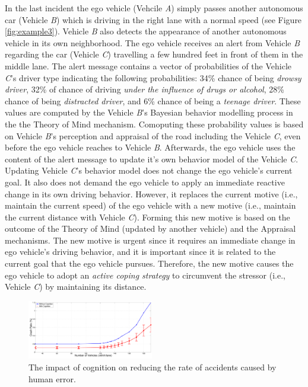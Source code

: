 \documentclass[journal, 11pt]{IEEEtran}
\begin{document}
In the last incident the ego vehicle (Vehcile \textit{A}) simply passes another
autonomous car (Vehicle \textit{B}) which is driving in the right lane with a
normal speed (see Figure \ref{fig:example3}). Vehicle \textit{B} also detects
the appearance of another autonomous vehicle in its own neighborhood. The ego
vehicle receives an alert from Vehicle \textit{B} regarding the car (Vehicle
\textit{C}) travelling a few hundred feet in front of them in the middle lane.
The alert message contains a vector of probabilities of the Vehicle \textit{C}'s
driver type indicating the following probabilities: 34\% chance of being
\textit{drowsy driver}, 32\% of chance of driving \textit{under the influence of
drugs or alcohol}, 28\% chance of being \textit{distracted driver}, and 6\%
chance of being a \textit{teenage driver}. These values are computed by the
Vehicle \textit{B}'s Bayesian behavior modelling process in the the Theory of
Mind mechanism. Comoputing these probability values is based on Vehicle
\textit{B}'s perception and appraisal of the road including the Vehicle
\textit{C}, even before the ego vehicle reaches to Vehicle \textit{B}.
Afterwards, the ego vehicle uses the content of the alert message to update it's
own behavior model of the Vehicle \textit{C}. Updating Vehicle \textit{C}'s
behavior model does not change the ego vehicle's current goal. It also does not
demand the ego vehicle to apply an immediate reactive change in its own driving
behavior. However, it replaces the current motive (i.e., maintain the current
speed) of the ego vehicle with a new motive (i.e., maintain the current distance
with Vehicle \textit{C}). Forming this new motive is based on the outcome of the
Theory of Mind (updated by another vehicle) and the Appraisal mechanisms. The
new motive is urgent since it requires an immediate change in ego vehicle's
driving behavior, and it is important since it is related to the current goal
that the ego vehicle pursues. Therefore, the new motive causes the ego vehicle
to adopt an \textit{active coping strategy} to circumvent the stressor (i.e.,
Vehicle \textit{C}) by maintaining its distance.

\begin{figure}[!t]
  \centering
  \includegraphics[width=0.49\textwidth]{figs/errorPlot.pdf}
  \caption{{\fontsize{10}{10}\selectfont The impact of cognition on reducing the
  rate of accidents caused by human error.}}
  \label{fig:peactidm}
  \vspace*{-6mm}
\end{figure}
\end{document}

